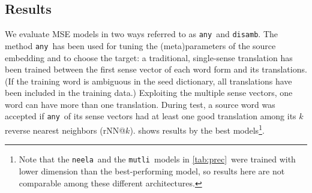 \documentclass[11pt]{article}
\newcommand{\neelakantan}{\texttt{neela}}
\newcommand{\mutli}{\texttt{mutli}}
\newcommand{\any}{\texttt{any}}
\newcommand{\disamb}{\texttt{disamb}}
\newcommand{\todo}[1]{}
\begin{document}
\subsection{Results}

\label{sec:res}


We evaluate MSE models in two ways referred to as \any~and \disamb.  The method
\any~has been used for tuning the (meta)parameters of the source embedding and
to choose the target: a traditional, single-sense translation has been trained
between the first\todo{all} sense vector of each word form and its
translations. (If the training word is ambiguous in the seed dictionary, all
translations have been included in the training data.)  Exploiting the multiple
sense vectors, one word can have more than one translation.  During test, a
source word was accepted if \any~\todo{the 1st}of its sense vectors had at
least one good translation among its $k$ reverse nearest neighbors (rNN@$k$).
 shows results by the best models\footnote{ Note that the
\neelakantan~and the \mutli~models in \cref{tab:prec}~were trained with lower
dimension than the best-performing model, so results here are not comparable
among these different architectures.}.
\end{document}
